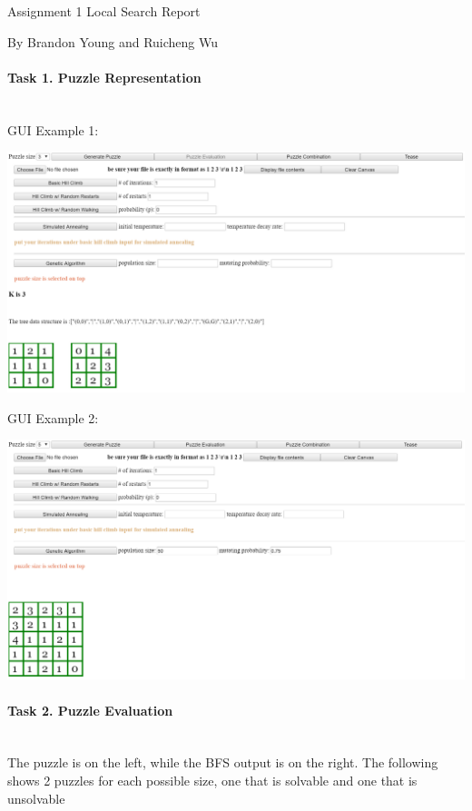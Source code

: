 \documentclass[12pt, letterpaper]{article}
\begin{document}
Assignment 1 Local Search Report

By Brandon Young and Ruicheng Wu

\bigskip

\paragraph{Task 1. Puzzle Representation} \mbox{}\\

\quad GUI Example 1:

\includegraphics[width=\linewidth]{"Task 1/Sample GUI 1"}

\quad GUI Example 2:

\includegraphics[width=\linewidth]{"Task 1/Sample GUI 2"}

\pagebreak

\paragraph{Task 2. Puzzle Evaluation} \mbox{}\\

\quad The puzzle is on the left, while the BFS output is on the right. The following shows 2 puzzles for each possible size, one that is solvable and one that is unsolvable
\end{document}
